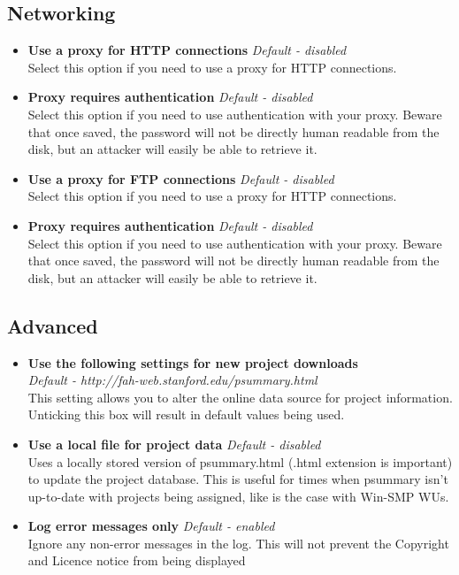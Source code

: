 \subsection{Networking}
\begin{itemize}
 \item   \textbf{Use a proxy for HTTP connections} \textit{Default - disabled}
  \\Select this option if you need to use a proxy for HTTP connections.
 \item   \textbf{Proxy requires authentication} \textit{Default - disabled}
  \\Select this option if you need to use authentication with your proxy. Beware
   that once saved, the password will not be directly human readable from the
   disk, but an attacker will easily be able to retrieve it.
 \item   \textbf{Use a proxy for FTP connections} \textit{Default - disabled}
  \\Select this option if you need to use a proxy for HTTP connections.
 \item   \textbf{Proxy requires authentication} \textit{Default - disabled}
  \\Select this option if you need to use authentication with your proxy. Beware
   that once saved, the password will not be directly human readable from the
   disk, but an attacker will easily be able to retrieve it.
\end{itemize}

\subsection{Advanced}
\begin{itemize}
 \item   \textbf{Use the following settings for new project downloads}
  \\\textit{Default - http://fah-web.stanford.edu/psummary.html}
  \\This setting allows you to alter the online data source for project
   information. Unticking this box will result in default values being used.
 \item   \textbf{Use a local file for project data} \textit{Default - disabled}
  \\Uses a locally stored version of psummary.html (.html extension is
   important) to update the project database. This is useful for times when
   psummary isn't up-to-date with projects being assigned, like is the case with
   Win-SMP WUs.
 \item \textbf{Log error messages only} \textit{Default - enabled}
  \\Ignore any non-error messages in the log. This will not prevent the
   Copyright and Licence notice from being displayed
\end{itemize}


